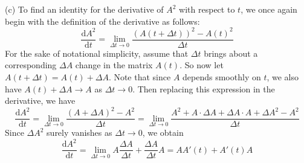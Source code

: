 \documentclass{article}
\begin{document}
(c) To find an identity for the derivative of $A^{2}$ with respect to $t$, we once again begin with the definition of the derivative as follows:
\begin{equation*}
    \frac{\text{d}A^{2}}{\text{d}t} = \lim_{\Delta t \to 0} \frac{(A(t + \Delta t))^{2} - A(t)^{2}}{\Delta t}
\end{equation*}
For the sake of notational simplicity, assume that $\Delta t$ brings about a corresponding $\Delta A$ change in the matrix $A(t)$. So now let $A(t + \Delta t) = A(t) + \Delta A$. Note that since $A$ depends smoothly on $t$, we also have $A(t) + \Delta A \to A$ as $\Delta t \to 0$. Then replacing this expression in the derivative, we have
\begin{equation*}
    \frac{\text{d}A^{2}}{\text{d}t} = \lim_{\Delta t \to 0}\frac{(A+\Delta A)^{2} - A^{2}}{\Delta t} = \lim_{\Delta t \to 0}\frac{A^{2} + A\cdot \Delta A + \Delta A \cdot A + \Delta A^{2} - A^{2}}{\Delta t}
\end{equation*}
Since $\Delta A^{2}$ surely vanishes as $\Delta t \to 0$, we obtain
\begin{equation*}
    \frac{\text{d}A^{2}}{\text{d}t} = \lim_{\Delta t \to 0} A \frac{\Delta A}{\Delta t} + \frac{\Delta A}{\Delta t} A = AA'(t) + A'(t)A
\end{equation*}
\end{document}
